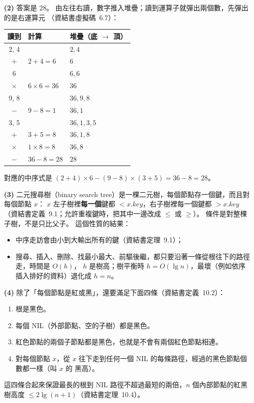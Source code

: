\begin{pastsoln}
\textbf{(2)} 答案是 $28$。 由左往右讀，數字推入堆疊；讀到運算子就彈出兩個數，先彈出的是右運算元
（資結書虛擬碼~6.7）：
\begin{center}
\begin{tabular}{cll}
\toprule
讀到 & 計算 & 堆疊（底 $\to$ 頂） \\
\midrule
2, 4 & & $2, 4$ \\
$+$ & $2 + 4 = 6$ & $6$ \\
6 & & $6, 6$ \\
$\times$ & $6 \times 6 = 36$ & $36$ \\
9, 8 & & $36, 9, 8$ \\
$-$ & $9 - 8 = 1$ & $36, 1$ \\
3, 5 & & $36, 1, 3, 5$ \\
$+$ & $3 + 5 = 8$ & $36, 1, 8$ \\
$\times$ & $1 \times 8 = 8$ & $36, 8$ \\
$-$ & $36 - 8 = 28$ & $28$ \\
\bottomrule
\end{tabular}
\end{center}
對應的中序式是 $(2 + 4) \times 6 - (9 - 8) \times (3 + 5) = 36 - 8 = 28$。

\textbf{(3)} 二元搜尋樹（binary search tree）是一棵二元樹，每個節點存一個鍵，而且對每個節點 $x$：
$x$ 左子樹裡\textbf{每一個}鍵都 $< x.\mathit{key}$，右子樹裡每一個鍵都 $> x.\mathit{key}$
（資結書定義~9.1；允許重複鍵時，把其中一邊改成 $\le$ 或 $\ge$）。 條件是對整棵子樹，不是只比父子。 這個性質的結果：
\begin{itemize}
\item 中序走訪會由小到大輸出所有的鍵（資結書定理~9.1）；
\item 搜尋、插入、刪除、找最小最大、前驅後繼，都只要沿著一條從根往下的路徑走，時間是 $O(h)$，
$h$ 是樹高；樹平衡時 $h = O(\lg n)$，最壞（例如依序插入排好的資料）退化成 $h = n$。
\end{itemize}

\textbf{(4)} 除了「每個節點是紅或黑」，還要滿足下面四條（資結書定義~10.2）：
\begin{enumerate}[label=(\roman*)]
\item 根是黑色。
\item 每個 NIL（外部節點、空的子樹）都是黑色。
\item 紅色節點的兩個子節點都是黑色，也就是不會有兩個紅色節點相連。
\item 對每個節點 $x$，從 $x$ 往下走到任何一個 NIL 的每條路徑，經過的黑色節點個數都一樣（叫 $x$ 的
黑高）。
\end{enumerate}
這四條合起來保證最長的根到 NIL 路徑不超過最短的兩倍，$n$ 個內部節點的紅黑樹高度
$\le 2\lg(n+1)$（資結書定理~10.4）。


\end{pastsoln}
